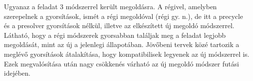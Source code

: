 Ugyanaz a feladat 3 módszerrel került megoldásra. A régivel, amelyben szerepelnek a gyorsítások, ismét a régi megoldóval (régi gy. n.), de itt a precycle és a presolver gyorsítások nélkül, illetve az elkészített új megoldó módszerrel. Látható, hogy a régi módszerek gyorsabban találjak meg a feladat legjobb megoldását, mint az új a jelenlegi állapotában. Jövőbeni tervek közé tartozik a meglévő gyorsítások átalakítása, hogy kompatibilisek legyenek az új módszerrel is. Ezek megvalósítása után nagy csökkenés várható az új megoldó módszer futási idejében. 